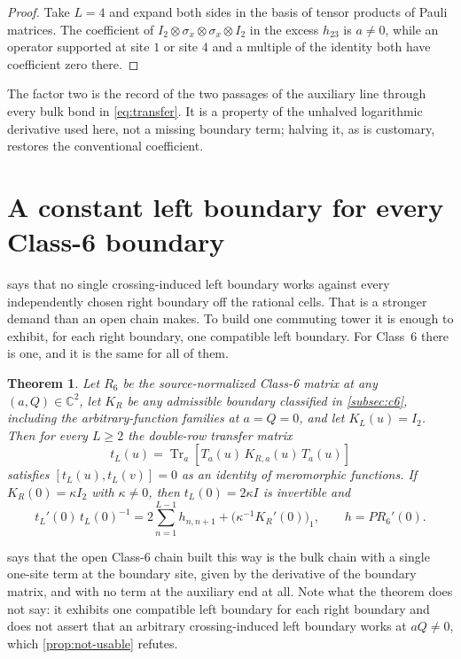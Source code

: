 \documentclass[11pt,reqno]{amsart}
\theoremstyle{plain}
\newtheorem{theorem}{Theorem}[section]
\theoremstyle{definition}
\theoremstyle{remark}
\numberwithin{equation}{section}
\newcommand{\Tr}{\operatorname{Tr}}
\newcommand{\C}{\mathbb C}
\newcommand{\Id}{I_2}
\begin{document}
\begin{proof}
Take $L=4$ and expand both sides in the basis of tensor products of Pauli
matrices. The coefficient of
$\Id\otimes\sigma_x\otimes\sigma_x\otimes\Id$ in the excess $h_{23}$ is $a\ne0$,
while an operator supported at site $1$ or site $4$ and a multiple of the identity
both have coefficient zero there.
\end{proof}

The factor two is the record of the two passages of the auxiliary line through
every bulk bond in \cref{eq:transfer}. It is a property of the unhalved
logarithmic derivative used here, not a missing boundary term; halving it, as is
customary, restores the conventional coefficient.

\section{A constant left boundary for every Class-6 boundary}
\label{sec:class6}

 says that no single crossing-induced left boundary works
against every independently chosen right boundary off the rational cells. That is
a stronger demand than an open chain makes. To build one commuting tower it is
enough to exhibit, for each right boundary, one compatible left boundary. For
Class~6 there is one, and it is the same for all of them.

\begin{theorem}
\label{thm:class6}
Let $R_6$ be the source-normalized Class-6 matrix at any
$(a,Q)\in\C^2$, let $K_R$ be any admissible boundary classified in
\cref{subsec:c6}, including the arbitrary-function families at $a=Q=0$, and let
$K_L(u)=\Id$. Then for every $L\ge2$ the double-row transfer matrix
\begin{equation}
t_L(u)=\Tr_a\!\left[T_a(u)\,K_{R,a}(u)\,\widehat T_a(u)\right]
\label{eq:C6-transfer}
\end{equation}
satisfies $[t_L(u),t_L(v)]=0$ as an identity of meromorphic functions. If
$K_R(0)=\kappa\Id$ with $\kappa\ne0$, then $t_L(0)=2\kappa I$ is invertible and
\begin{equation}
t_L'(0)\,t_L(0)^{-1}
=2\sum_{n=1}^{L-1}h_{n,n+1}
 +\bigl(\kappa^{-1}K_R'(0)\bigr)_1,
\qquad h=P R_6'(0).                                \label{eq:C6-hamiltonian}
\end{equation}
\end{theorem}

 says that the open Class-6 chain built this way is the
bulk chain with a single one-site term at the boundary site, given by the
derivative of the boundary matrix, and with no term at the auxiliary end at all.
Note what the theorem does not say: it exhibits one compatible left boundary for
each right boundary and does not assert that an arbitrary crossing-induced left
boundary works at $aQ\ne0$, which \cref{prop:not-usable} refutes.
\end{document}
